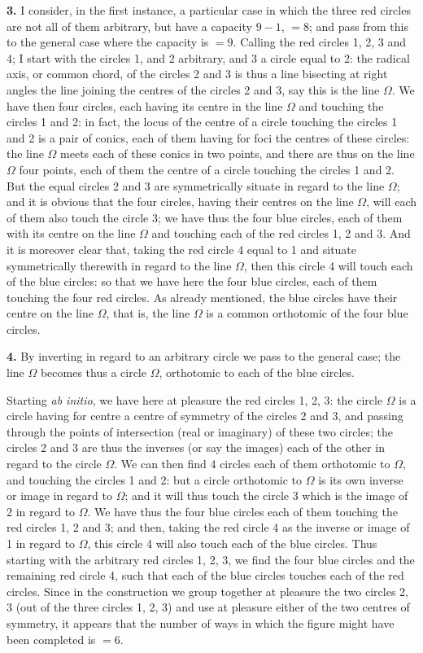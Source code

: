 \documentclass[11pt]{article}
\begin{document}
\medskip
\noindent\textbf{3.} I consider, in the first instance, a particular case in which the three red circles are not all of them arbitrary, but have a capacity $9 - 1$, $= 8$; and pass from this to the general case where the capacity is $= 9$. Calling the red circles 1, 2, 3 and 4; I start with the circles 1, and 2 arbitrary, and 3 a circle equal to 2: the radical axis, or common chord, of the circles 2 and 3 is thus a line bisecting at right angles the line joining the centres of the circles 2 and 3, say this is the line $\Omega$. We have then four circles, each having its centre in the line $\Omega$ and touching the circles 1 and 2: in fact, the locus of the centre of a circle touching the circles 1 and 2 is a pair of conics, each of them having for foci the centres of these circles: the line $\Omega$ meets each of these conics in two points, and there are thus on the line $\Omega$ four points, each of them the centre of a circle touching the circles 1 and 2. But the equal circles 2 and 3 are symmetrically situate in regard to the line $\Omega$; and it is obvious that the four circles, having their centres on the line $\Omega$, will each of them also touch the circle 3; we have thus the four blue circles, each of them with its centre on the line $\Omega$ and touching each of the red circles 1, 2 and 3. And it is moreover clear that, taking the red circle 4 equal to 1 and situate symmetrically therewith in regard to the line $\Omega$, then this circle 4 will touch each of the blue circles: so that we have here the four blue circles, each of them touching the four red circles. As already mentioned, the blue circles have their centre on the line $\Omega$, that is, the line $\Omega$ is a common orthotomic of the four blue circles.

\medskip
\noindent\textbf{4.} By inverting in regard to an arbitrary circle we pass to the general case; the line $\Omega$ becomes thus a circle $\Omega$, orthotomic to each of the blue circles.

Starting \textit{ab initio}, we have here at pleasure the red circles 1, 2, 3: the circle $\Omega$ is a circle having for centre a centre of symmetry of the circles 2 and 3, and passing through the points of intersection (real or imaginary) of these two circles; the circles 2 and 3 are thus the inverses (or say the images) each of the other in regard to the circle $\Omega$. We can then find 4 circles each of them orthotomic to $\Omega$, and touching the circles 1 and 2: but a circle orthotomic to $\Omega$ is its own inverse or image in regard to $\Omega$; and it will thus touch the circle 3 which is the image of 2 in regard to $\Omega$. We have thus the four blue circles each of them touching the red circles 1, 2 and 3; and then, taking the red circle 4 as the inverse or image of 1 in regard to $\Omega$, this circle 4 will also touch each of the blue circles. Thus starting with the arbitrary red circles 1, 2, 3, we find the four blue circles and the remaining red circle 4, such that each of the blue circles touches each of the red circles. Since in the construction we group together at pleasure the two circles 2, 3 (out of the three circles 1, 2, 3) and use at pleasure either of the two centres of symmetry, it appears that the number of ways in which the figure might have been completed is $= 6$.
\end{document}
